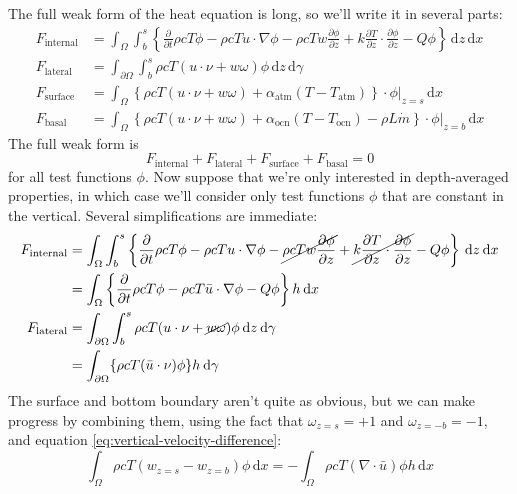 \documentclass{article}
\theoremstyle{definition}
\theoremstyle{plain}
\newcommand{\ud}{\hspace{2pt}\mathrm{d}}
\begin{document}
The full weak form of the heat equation is long, so we'll write it in several parts:
\begin{align}
    F_{\text{internal}} & = \int_\Omega\int_b^s\left\{\frac{\partial}{\partial t}\rho cT\phi - \rho cT u\cdot\nabla\phi - \rho cTw\frac{\partial\phi}{\partial z} + k\frac{\partial T}{\partial z}\cdot\frac{\partial\phi}{\partial z} - Q\phi\right\}\ud z\ud x \\
    F_{\text{lateral}} & = \int_{\partial\Omega}\int_b^s \rho cT(u\cdot\nu + w\omega)\phi \ud z\ud\gamma \\
    F_{\text{surface}} & = \int_\Omega\left\{\rho cT(u\cdot\nu + w\omega) + \alpha_{\text{atm}}(T - T_{\text{atm}})\right\}\cdot\phi\Big|_{z = s}\ud x \\
    F_{\text{basal}} & = \int_\Omega\left\{\rho cT(u\cdot\nu + w\omega) + \alpha_{\text{ocn}}(T - T_{\text{ocn}}) - \rho L\dot m\right\}\cdot\phi\Big|_{z = b}\ud x
\end{align}
The full weak form is
\begin{equation}
    F_{\text{internal}} + F_{\text{lateral}} + F_{\text{surface}} + F_{\text{basal}} = 0
    \label{eq:full-weak-form}
\end{equation}
for all test functions $\phi$.
Now suppose that we're only interested in depth-averaged properties, in which case we'll consider only test functions $\phi$ that are constant in the vertical.
Several simplifications are immediate:
\begin{align}
    F_{\text{internal}} & = \int_\Omega\int_b^s\left\{\frac{\partial}{\partial t}\rho cT\phi - \rho cT u\cdot\nabla\phi - \cancel{\rho cTw\frac{\partial\phi}{\partial z}} + \cancel{k\frac{\partial T}{\partial z}\cdot\frac{\partial\phi}{\partial z}} - Q\phi\right\}\ud z\ud x \nonumber\\
    & = \int_\Omega\left\{\frac{\partial}{\partial t}\rho cT\phi - \rho cT\bar u\cdot\nabla\phi - Q\phi\right\}h\ud x \\
    F_{\text{lateral}} & = \int_{\partial\Omega}\int_b^s \rho cT(u\cdot\nu + \cancel{w\omega})\phi \ud z\ud\gamma \nonumber\\
    & = \int_{\partial\Omega}\{\rho cT(\bar u\cdot\nu)\phi\}h\ud\gamma
\end{align}
The surface and bottom boundary aren't quite as obvious, but we can make progress by combining them, using the fact that $\omega_{z = s} = +1$ and $\omega_{z = -b} = -1$, and equation \eqref{eq:vertical-velocity-difference}:
\begin{equation}
    \int_\Omega\rho cT(w_{z = s} - w_{z = b})\phi\ud x = -\int_\Omega\rho cT(\nabla\cdot\bar u)\phi h\ud x
\end{equation}
\end{document}
